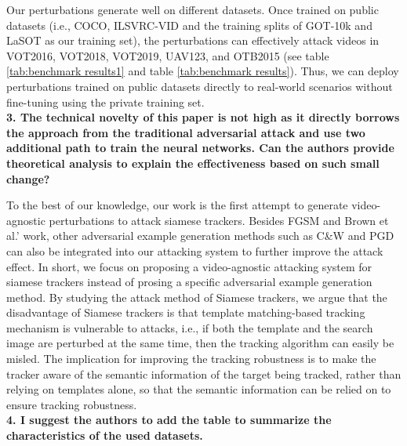 \documentclass{article}
\begin{document}
Our perturbations generate well on different datasets. Once trained on public datasets (i.e., COCO, ILSVRC-VID and the training splits of GOT-10k and LaSOT as our training set), the perturbations can effectively attack videos in VOT2016, VOT2018, VOT2019, UAV123, and OTB2015 (see table \ref{tab:benchmark results1} and table \ref{tab:benchmark results}). Thus, we can deploy perturbations trained on public datasets directly to real-world scenarios without fine-tuning using the private training set.
\\[6pt]
\noindent \textbf{3. The technical novelty of this paper is not high as it directly borrows the approach from the traditional adversarial attack and use two additional path to train the neural networks. Can the authors provide theoretical analysis to explain the effectiveness based on such small change?}

To the best of our knowledge, our work is the first attempt to generate video-agnostic perturbations to attack siamese trackers. Besides FGSM and Brown et al.' work, other adversarial example generation methods such as C\&W \cite{carlini2017towards} and PGD \cite{PGD} can also be integrated into our attacking system to further improve the attack effect.
In short, we focus on proposing a video-agnostic attacking system for siamese trackers instead of prosing a specific adversarial example generation method.
By studying the attack method of Siamese trackers, we argue that the disadvantage of Siamese trackers is that template matching-based tracking mechanism is vulnerable to attacks, i.e., if both the template and the search image are perturbed at the same time, then the tracking algorithm can easily be misled.
The implication for improving the tracking robustness is to make the tracker aware of the semantic information of the target being tracked, rather than relying on templates alone, so that the semantic information can be relied on to ensure tracking robustness.
\\[6pt]
\noindent \textbf{4. I suggest the authors to add the table to summarize the characteristics of the used datasets.}
\end{document}
